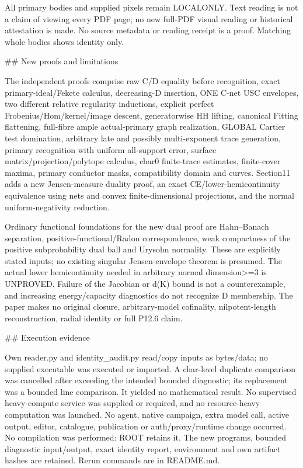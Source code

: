 \documentclass[11pt]{article}
\begin{document}
\begin{ImportedQualifiedGrant}
All primary bodies and supplied pixels remain LOCALONLY. Text reading is not a claim of viewing every PDF page; no new full-PDF visual reading or historical attestation is made. No source metadata or reading receipt is a proof. Matching whole bodies shows identity only.

## New proofs and limitations

The independent proofs comprise raw C/D equality before recognition, exact primary-ideal/Fekete calculus, decreasing-D insertion, ONE C-net USC envelopes, two different relative regularity inductions, explicit perfect Frobenius/Hom/kernel/image descent, generatorwise HH lifting, canonical Fitting flattening, full-fibre ample actual-primary graph realization, GLOBAL Cartier test domination, arbitrary late and possibly multi-exponent trace generation, primary recognition with uniform all-support error, surface matrix/projection/polytope calculus, char0 finite-trace estimates, finite-cover maxima, primary conductor masks, compatibility domain and curves. Section11 adds a new Jensen-measure duality proof, an exact CE/lower-hemicontinuity equivalence using nets and convex finite-dimensional projections, and the normal uniform-negativity reduction.

Ordinary functional foundations for the new dual proof are Hahn--Banach separation, positive-functional/Radon correspondence, weak compactness of the positive subprobability dual ball and Urysohn normality. These are explicitly stated inputs; no existing singular Jensen-envelope theorem is presumed. The actual lower hemicontinuity needed in arbitrary normal dimension>=3 is UNPROVED. Failure of the Jacobian or d(K) bound is not a counterexample, and increasing energy/capacity diagnostics do not recognize D membership. The paper makes no original closure, arbitrary-model cofinality, nilpotent-length reconstruction, radial identity or full P12.6 claim.

## Execution evidence

Own reader.py and identity_audit.py read/copy inputs as bytes/data; no supplied executable was executed or imported. A char-level duplicate comparison was cancelled after exceeding the intended bounded diagnostic; its replacement was a bounded line comparison. It yielded no mathematical result. No supervised heavy-compute service was supplied or required, and no resource-heavy computation was launched. No agent, native campaign, extra model call, active output, editor, catalogue, publication or auth/proxy/runtime change occurred. No compilation was performed: ROOT retains it. The new programs, bounded diagnostic input/output, exact identity report, environment and own artifact hashes are retained. Rerun commands are in README.md.


\end{ImportedQualifiedGrant}
\end{document}
